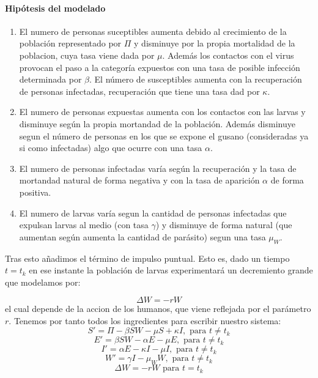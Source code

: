 \documentclass[1p]{elsarticle}
\begin{document}
\paragraph{Hipótesis del modelado}
\begin{enumerate}
	\item El numero de personas suceptibles aumenta debido al crecimiento de la población representado por $\Pi$ y disminuye por la propia mortalidad de la poblacion, cuya tasa viene dada por $\mu$. Además los contactos con el virus provocan el paso a la categoría expuestos con una tasa de posible infección determinada por $\beta$. El número de susceptibles aumenta con la recuperación de personas infectadas, recuperación que tiene una tasa dad por $\kappa$.
	\item El numero de personas expuestas aumenta con los contactos con las larvas y disminuye según la propia mortandad de la población. Además disminuye segun el número de personas en los que se expone el gusano (consideradas ya si como infectadas) algo que ocurre con una tasa $\alpha$.
	\item El numero de personas infectadas varía según la recuperación y la tasa de mortandad natural de forma negativa y con la tasa de aparición $\alpha$ de forma positiva.
	\item El numero de larvas varía segun la cantidad de personas infectadas que expulsan larvas al medio (con tasa $\gamma$) y disminuye de forma natural (que aumentan según aumenta la cantidad de parásito) segun una tasa $\mu_W$.
\end{enumerate}
Tras esto añadimos el término de impulso puntual. Esto es, dado un tiempo $t=t_k$ en ese instante la población de larvas experimentará un decremiento grande que modelamos por: 

$$ \Delta W= -rW$$
el cual depende de la accion de los humanos, que viene reflejada por el parámetro $r$.
Tenemos por tanto todos los ingredientes para escribir nuestro sistema:
\begin{equation}
S'=\Pi-\beta SW-\mu S+\kappa I, \text{ para }t\neq t_k
\end{equation}
\begin{equation}
E'=\beta S W -\alpha E -\mu E, \text{ para }t\neq t_k
\end{equation}
\begin{equation}
I'=\alpha E-\kappa I -\mu I, \text{ para }t\neq t_k
\end{equation}
\begin{equation}
W'=\gamma I - \mu_W W,  \text{ para }t\neq t_k
\end{equation}
\begin{equation}
\Delta W= -rW   \text{ para }t=t_k
\end{equation}
\end{document}
